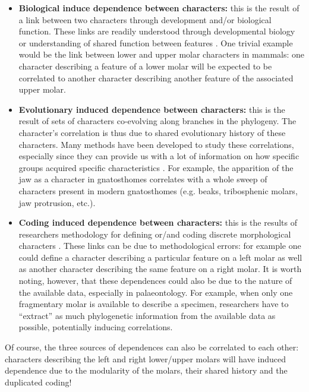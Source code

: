 \documentclass[12pt,letterpaper]{article}
\begin{document}
\begin{itemize}
    \item \textbf{Biological induce dependence between characters:} this is the result of a link between two characters through development and/or biological function.
    These links are readily understood through developmental biology or understanding of shared function between features \citep{goswami2006morphological,goswami2010,goswami2014macroevolutionary}.
    One trivial example would be the link between lower and upper molar characters in mammals: one character describing a feature of a lower molar will be expected to be correlated to another character describing another feature of the associated upper molar.

    \item \textbf{Evolutionary induced dependence between characters:} this is the result of sets of characters co-evolving along branches in the phylogeny.
    The character's correlation is thus due to shared evolutionary history of these characters.
    Many methods have been developed to study these correlations, especially since they can provide us with a lot of information on how specific groups acquired specific characteristics \citep{Lande1983,Maddison1990,Pagel1994,Pagel2006,Grabowski2016}.
    For example, the apparition of the jaw as a character in gnatosthomes correlates with a whole sweep of characters present in modern gnatosthomes (e.g. beaks, tribosphenic molars, jaw protrusion, etc.). %

    \item \textbf{Coding induced dependence between characters:} this is the results of researchers methodology for defining or/and coding discrete morphological characters \citep{Brazeau2011,simoes2017giant}.
    These links can be due to methodological errors: for example one could define a character describing a particular feature on a left molar as well as another character describing the same feature on a right molar.
    It is worth noting, however, that these dependences could also be due to the nature of the available data, especially in palaeontology.
    For example, when only one fragmentary molar is available to describe a specimen, researchers have to ``extract'' as much phylogenetic information from the available data as possible, potentially inducing correlations.
\end{itemize}

\noindent Of course, the three sources of dependences can also be correlated to each other: characters describing the left and right lower/upper molars will have induced dependence due to the modularity of the molars, their shared history and the duplicated coding!
\end{document}
